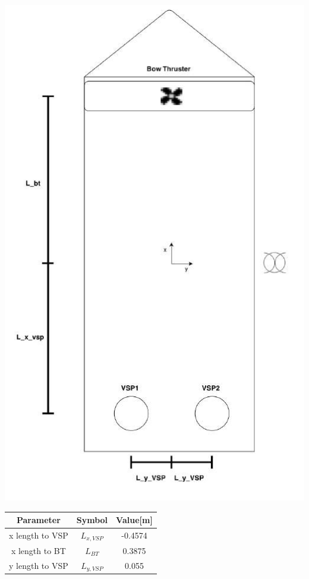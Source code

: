 \begin{minipage}{\textwidth}
	\begin{minipage}[b]{0.49\textwidth}
		\centering
		\includegraphics[width=\linewidth]{fig/actuators_overview.png}
		\label{fig:position_of_actuators}
	\end{minipage}
	\hfill
	\begin{minipage}[b]{0.49\textwidth}
		\centering
		\begin{tabular}{ccc}
		\hline
		\textbf{Parameter} & \textbf{Symbol} & \textbf{Value}[m]\\\hline
		x length to VSP & $L_{x,VSP}$ & -0.4574\\
		x length to BT & $L_{BT}$ & 0.3875\\
		y length to VSP & $L_{y,VSP}$ & 0.055\\\hline
		\end{tabular}
	\label{tab:thruster_distance}
	\end{minipage}
\vspace{0.5cm}
\end{minipage}

